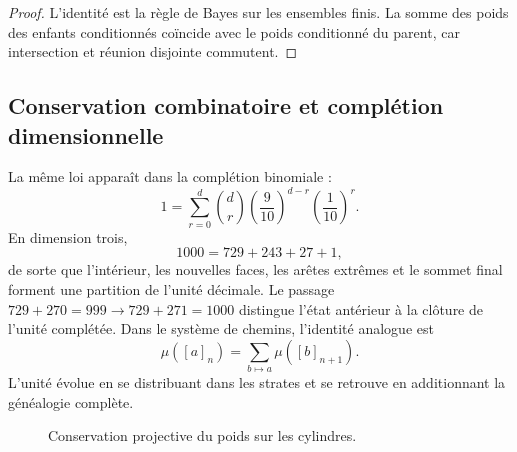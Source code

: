 \begin{proof}
L'identité est la règle de Bayes sur les ensembles finis. La somme des
poids des enfants conditionnés coïncide avec le poids conditionné du parent,
car intersection et réunion disjointe commutent.
\end{proof}

\subsection{Conservation combinatoire et complétion dimensionnelle}

La même loi apparaît dans la complétion binomiale :
\[
 1=\sum_{r=0}^{d}\binom dr
 \left(\frac9{10}\right)^{d-r}
 \left(\frac1{10}\right)^r.
\]
En dimension trois,
\[
 1000=729+243+27+1,
\]
de sorte que l'intérieur, les nouvelles faces, les arêtes extrêmes et le sommet final forment
une partition de l'unité décimale. Le passage
\(729+270=999\to729+271=1000\) distingue l'état antérieur à la clôture de
l'unité complétée. Dans le système de chemins, l'identité analogue est
\[
 \mu([a]_n)=\sum_{b\mapsto a}\mu([b]_{n+1}).
\]
L'unité évolue en se distribuant dans les strates et se retrouve en additionnant
la généalogie complète.

\begin{figure}[htbp]
\centering
{}
\caption{Conservation projective du poids sur les cylindres.}
\label{p12-83-c6-s1:fig:conservacion-peso-cilindros}
\end{figure}

